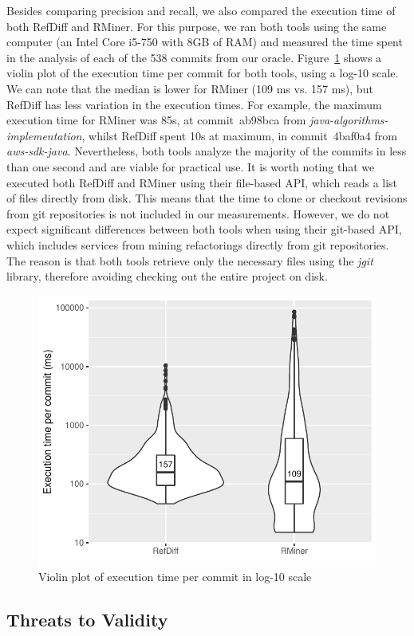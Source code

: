 Besides comparing precision and recall, we also compared the execution time of both RefDiff and RMiner.
For this purpose, we ran both tools using the same computer (an Intel Core i5-750 with 8GB of RAM) and measured the time spent in the analysis of each of the 538 commits from our oracle.
Figure~\ref{FigVioplotExecTime} shows a violin plot of the execution time per commit for both tools, using a log-10 scale.
We can note that the median is lower for RMiner (109 ms vs. 157 ms), but RefDiff has less variation in the execution times. For example, the maximum execution time for RMiner was 85s, at commit~ab98bca from  \textit{java-algorithms-implementation}, whilst RefDiff spent 10s at maximum, in commit~4baf0a4 from \textit{aws-sdk-java}.
Nevertheless, both tools analyze the majority of the commits in less than one second and are viable for practical use.
It is worth noting that we executed both RefDiff and RMiner using their file-based API, which  reads a list of files directly from disk.
This means that the time to clone or checkout revisions from git repositories is not included in our measurements.
However, we do not expect significant differences between both tools when using their git-based API, which includes services from mining refactorings directly from git repositories. The reason is that both tools retrieve only the necessary files using the \textit{jgit} library, therefore avoiding checking out the entire project on disk.

\begin{figure}[htbp]
\centering
\includegraphics[width=0.7\linewidth]{img/vioplot-exec-time.pdf}
\caption{Violin plot of execution time per commit in log-10 scale}
\label{FigVioplotExecTime}
\end{figure}

\subsection{Threats to Validity}
\label{SecThreatsJava}


